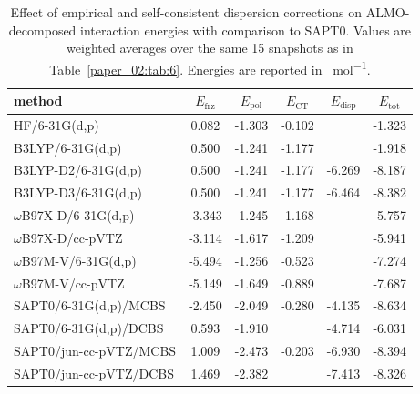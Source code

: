 \documentclass[%
  class = book,%
  crop = false,%
  float = true,%
  multi = true,%
  preview = false,%
]{standalone}
\begin{document}
\begin{table}
  \centering
  \caption[Effect of empirical and self-consistent dispersion corrections in ALMO-EDA]{Effect of empirical and self-consistent dispersion corrections on ALMO-decomposed interaction energies with comparison to SAPT0. Values are weighted averages over the same \num{15} snapshots as in Table~\ref{paper_02:tab:6}. Energies are reported in \si{\kcal\per\mole}.}
  \label{paper_02:tab:S3}
  \begin{tabular}{lccccc}
    \toprule
    method & \(E_{\text{frz}}\) & \(E_{\text{pol}}\) & \(E_{\text{CT}}\) & \(E_{\text{disp}}\) & \(E_{\text{tot}}\) \\
    \midrule
    HF/6-31G(d,p) & 0.082 & -1.303 & -0.102 & \textemdash{} & -1.323 \\
    B3LYP/6-31G(d,p) & 0.500 & -1.241 & -1.177 & \textemdash{} & -1.918 \\
    B3LYP-D2/6-31G(d,p) & 0.500 & -1.241 & -1.177 & -6.269 & -8.187 \\
    B3LYP-D3/6-31G(d,p) & 0.500 & -1.241 & -1.177 & -6.464 & -8.382 \\
    \(\omega\)B97X-D/6-31G(d,p) & -3.343 & -1.245 & -1.168 & \textemdash{} & -5.757 \\
    \(\omega\)B97X-D/cc-pVTZ & -3.114 & -1.617 & -1.209 & \textemdash{} & -5.941 \\
    \(\omega\)B97M-V/6-31G(d,p) & -5.494 & -1.256 & -0.523 & \textemdash{} & -7.274 \\
    \(\omega\)B97M-V/cc-pVTZ & -5.149 & -1.649 & -0.889 & \textemdash{} & -7.687 \\
    SAPT0/6-31G(d,p)/MCBS & -2.450 & -2.049 & -0.280 & -4.135 & -8.634 \\
    SAPT0/6-31G(d,p)/DCBS & 0.593 & -1.910 & & -4.714 & -6.031 \\
    SAPT0/jun-cc-pVTZ/MCBS & 1.009 & -2.473 & -0.203 & -6.930 & -8.394 \\
    SAPT0/jun-cc-pVTZ/DCBS & 1.469 & -2.382 & & -7.413 & -8.326 \\
    \bottomrule
  \end{tabular}
\end{table}
\end{document}
